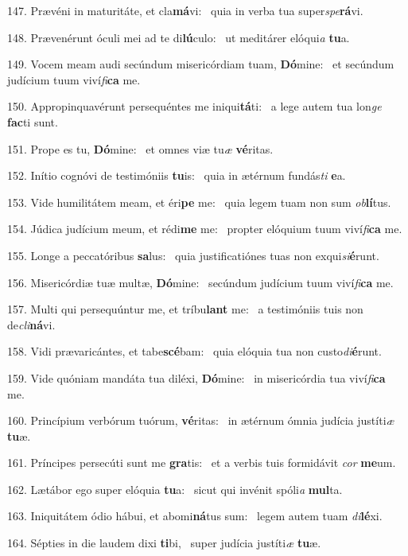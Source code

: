 147. Prævéni in maturitáte, et cla\textbf{má}vi: \ast\  quia in verba tua super\textit{spe}\textbf{rá}vi.\

148. Prævenérunt óculi mei ad te di\textbf{lú}culo: \ast\  ut meditárer elóqui\textit{a} \textbf{tu}a.\

149. Vocem meam audi secúndum misericórdiam tuam, \textbf{Dó}mine: \ast\  et secúndum judícium tuum viví\textit{fi}\textbf{ca} me.\

150. Appropinquavérunt persequéntes me iniqui\textbf{tá}ti: \ast\  a lege autem tua lon\textit{ge} \textbf{fac}ti sunt.\

151. Prope es tu, \textbf{Dó}mine: \ast\  et omnes viæ tu\textit{æ} \textbf{vé}ritas.\

152. Inítio cognóvi de testimóniis \textbf{tu}is: \ast\  quia in ætérnum fundás\textit{ti} \textbf{e}a.\

153. Vide humilitátem meam, et éri\textbf{pe} me: \ast\  quia legem tuam non sum \textit{ob}\textbf{lí}tus.\

154. Júdica judícium meum, et rédi\textbf{me} me: \ast\  propter elóquium tuum viví\textit{fi}\textbf{ca} me.\

155. Longe a peccatóribus \textbf{sa}lus: \ast\  quia justificatiónes tuas non exqui\textit{si}\textbf{é}runt.\

156. Misericórdiæ tuæ multæ, \textbf{Dó}mine: \ast\  secúndum judícium tuum viví\textit{fi}\textbf{ca} me.\

157. Multi qui persequúntur me, et tríbu\textbf{lant} me: \ast\  a testimóniis tuis non de\textit{cli}\textbf{ná}vi.\

158. Vidi prævaricántes, et tabe\textbf{scé}bam: \ast\  quia elóquia tua non custo\textit{di}\textbf{é}runt.\

159. Vide quóniam mandáta tua diléxi, \textbf{Dó}mine: \ast\  in misericórdia tua viví\textit{fi}\textbf{ca} me.\

160. Princípium verbórum tuórum, \textbf{vé}ritas: \ast\  in ætérnum ómnia judícia justíti\textit{æ} \textbf{tu}æ.\

161. Príncipes persecúti sunt me \textbf{gra}tis: \ast\  et a verbis tuis formidávit \textit{cor} \textbf{me}um.\

162. Lætábor ego super elóquia \textbf{tu}a: \ast\  sicut qui invénit spóli\textit{a} \textbf{mul}ta.\

163. Iniquitátem ódio hábui, et abomi\textbf{ná}tus sum: \ast\  legem autem tuam \textit{di}\textbf{lé}xi.\

164. Sépties in die laudem dixi \textbf{ti}bi, \ast\  super judícia justíti\textit{æ} \textbf{tu}æ.\

